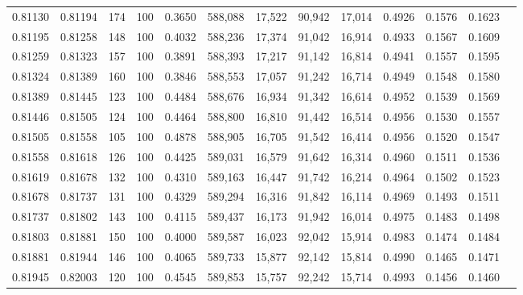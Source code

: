 \begin{tabular}{rrrrrrrrrrrrr}
0.81130 & 0.81194 &   174 & 100 &                                     0.3650 & 588,088 &  17,522 &  90,942 &  17,014 & 0.4926 & 0.1576 & 0.1623 \\
0.81195 & 0.81258 &   148 & 100 &                                     0.4032 & 588,236 &  17,374 &  91,042 &  16,914 & 0.4933 & 0.1567 & 0.1609 \\
0.81259 & 0.81323 &   157 & 100 &                                     0.3891 & 588,393 &  17,217 &  91,142 &  16,814 & 0.4941 & 0.1557 & 0.1595 \\
0.81324 & 0.81389 &   160 & 100 &                                     0.3846 & 588,553 &  17,057 &  91,242 &  16,714 & 0.4949 & 0.1548 & 0.1580 \\
0.81389 & 0.81445 &   123 & 100 &                                     0.4484 & 588,676 &  16,934 &  91,342 &  16,614 & 0.4952 & 0.1539 & 0.1569 \\
0.81446 & 0.81505 &   124 & 100 &                                     0.4464 & 588,800 &  16,810 &  91,442 &  16,514 & 0.4956 & 0.1530 & 0.1557 \\
0.81505 & 0.81558 &   105 & 100 &                                     0.4878 & 588,905 &  16,705 &  91,542 &  16,414 & 0.4956 & 0.1520 & 0.1547 \\
0.81558 & 0.81618 &   126 & 100 &                                     0.4425 & 589,031 &  16,579 &  91,642 &  16,314 & 0.4960 & 0.1511 & 0.1536 \\
0.81619 & 0.81678 &   132 & 100 &                                     0.4310 & 589,163 &  16,447 &  91,742 &  16,214 & 0.4964 & 0.1502 & 0.1523 \\
0.81678 & 0.81737 &   131 & 100 &                                     0.4329 & 589,294 &  16,316 &  91,842 &  16,114 & 0.4969 & 0.1493 & 0.1511 \\
0.81737 & 0.81802 &   143 & 100 &                                     0.4115 & 589,437 &  16,173 &  91,942 &  16,014 & 0.4975 & 0.1483 & 0.1498 \\
0.81803 & 0.81881 &   150 & 100 &                                     0.4000 & 589,587 &  16,023 &  92,042 &  15,914 & 0.4983 & 0.1474 & 0.1484 \\
0.81881 & 0.81944 &   146 & 100 &                                     0.4065 & 589,733 &  15,877 &  92,142 &  15,814 & 0.4990 & 0.1465 & 0.1471 \\
0.81945 & 0.82003 &   120 & 100 &                                     0.4545 & 589,853 &  15,757 &  92,242 &  15,714 & 0.4993 & 0.1456 & 0.1460 \\

\end{tabular}
